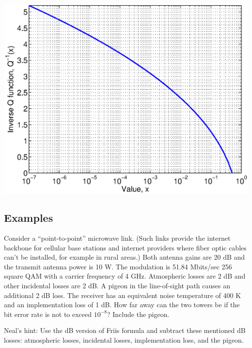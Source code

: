 \includegraphics[width=5.5in]{../images/plotQinv.eps}






\subsection{Examples}


Consider a ``point-to-point'' microwave link. (Such links provide the internet backbone for cellular base stations and internet providers where fiber optic cables can't be installed, for example in rural areas.) Both antenna gains are 20 dB and the transmit antenna power is 10 W. The modulation is 51.84 Mbits/sec 256 square QAM with a carrier frequency of 4 GHz. Atmospheric losses are 2 dB and other incidental losses are 2 dB. A pigeon in the line-of-sight path causes an additional 2 dB loss. The receiver has an equivalent noise temperature of 400 K and an implementation loss of 1 dB. How far away can the two towers be if the bit error rate is not to exceed $10^{-8}$? Include the pigeon. 

Neal's hint: Use the dB version of Friis formula and subtract these mentioned dB losses: atmospheric losses, incidental losses, implementation loss, and the pigeon.

